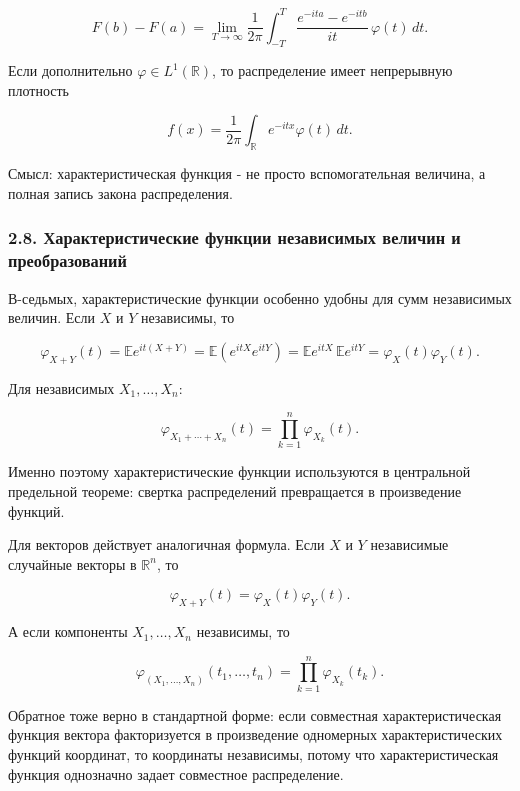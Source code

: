 \documentclass[
  11pt,
  a4paper,
]{article}
\begin{document}
\[
F(b)-F(a)
=
\lim_{T\to\infty}
\frac1{2\pi}
\int_{-T}^{T}
\frac{e^{-ita}-e^{-itb}}{it}\,\varphi(t)\,dt.
\]

Если дополнительно \(\varphi\in L^1(\mathbb R)\), то распределение имеет
непрерывную плотность

\[
f(x)=\frac1{2\pi}\int_{\mathbb R} e^{-itx}\varphi(t)\,dt.
\]

Смысл: характеристическая функция - не просто вспомогательная величина,
а полная запись закона распределения.

\subsubsection{2.8. Характеристические функции независимых величин и
преобразований}\label{ux445ux430ux440ux430ux43aux442ux435ux440ux438ux441ux442ux438ux447ux435ux441ux43aux438ux435-ux444ux443ux43dux43aux446ux438ux438-ux43dux435ux437ux430ux432ux438ux441ux438ux43cux44bux445-ux432ux435ux43bux438ux447ux438ux43d-ux438-ux43fux440ux435ux43eux431ux440ux430ux437ux43eux432ux430ux43dux438ux439}

В-седьмых, характеристические функции особенно удобны для сумм
независимых величин. Если \(X\) и \(Y\) независимы, то

\[
\varphi_{X+Y}(t)
=\mathbb E e^{it(X+Y)}
=\mathbb E(e^{itX}e^{itY})
=\mathbb E e^{itX}\,\mathbb E e^{itY}
=\varphi_X(t)\varphi_Y(t).
\]

Для независимых \(X_1,\ldots,X_n\):

\[
\varphi_{X_1+\cdots+X_n}(t)
=
\prod_{k=1}^n\varphi_{X_k}(t).
\]

Именно поэтому характеристические функции используются в центральной
предельной теореме: свертка распределений превращается в произведение
функций.

Для векторов действует аналогичная формула. Если \(X\) и \(Y\)
независимые случайные векторы в \(\mathbb R^n\), то

\[
\varphi_{X+Y}(t)=\varphi_X(t)\varphi_Y(t).
\]

А если компоненты \(X_1,\ldots,X_n\) независимы, то

\[
\varphi_{(X_1,\ldots,X_n)}(t_1,\ldots,t_n)
=
\prod_{k=1}^n\varphi_{X_k}(t_k).
\]

Обратное тоже верно в стандартной форме: если совместная
характеристическая функция вектора факторизуется в произведение
одномерных характеристических функций координат, то координаты
независимы, потому что характеристическая функция однозначно задает
совместное распределение.
\end{document}
